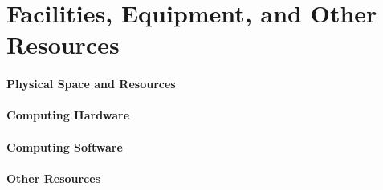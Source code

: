 \documentclass[11pt]{article}
\begin{document}
\section*{Facilities, Equipment, and Other Resources}

\paragraph{Physical Space and Resources}

\paragraph{Computing Hardware}

\paragraph{Computing Software}

\paragraph{Other Resources}
\end{document}
